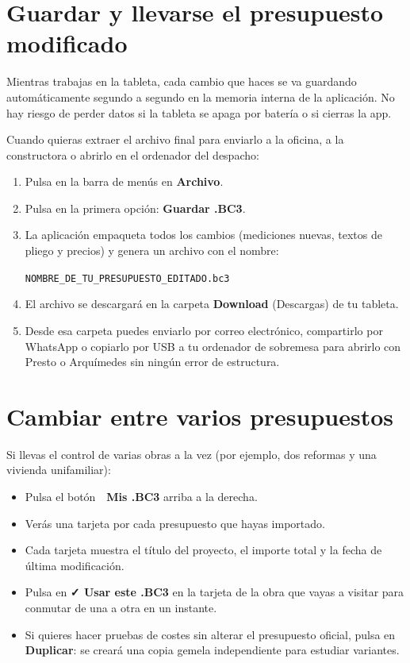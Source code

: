 \documentclass[11pt,a4paper]{article}
\begin{document}
\section{Guardar y llevarse el presupuesto modificado}

Mientras trabajas en la tableta, cada cambio que haces se va guardando automáticamente segundo a segundo en la memoria interna de la aplicación. No hay riesgo de perder datos si la tableta se apaga por batería o si cierras la app.

Cuando quieras extraer el archivo final para enviarlo a la oficina, a la constructora o abrirlo en el ordenador del despacho:

\begin{pasobox}
\begin{enumerate}[leftmargin=*]
    \item Pulsa en la barra de menús en \textbf{Archivo}.
    \item Pulsa en la primera opción: \textbf{Guardar .BC3}.
    \item La aplicación empaqueta todos los cambios (mediciones nuevas, textos de pliego y precios) y genera un archivo con el nombre:
    \begin{center}
    \texttt{NOMBRE\_DE\_TU\_PRESUPUESTO\_EDITADO.bc3}
    \end{center}
    \item El archivo se descargará en la carpeta \textbf{Download} (Descargas) de tu tableta.
    \item Desde esa carpeta puedes enviarlo por correo electrónico, compartirlo por WhatsApp o copiarlo por USB a tu ordenador de sobremesa para abrirlo con Presto o Arquímedes sin ningún error de estructura.
\end{enumerate}
\end{pasobox}

\section{Cambiar entre varios presupuestos}

Si llevas el control de varias obras a la vez (por ejemplo, dos reformas y una vivienda unifamiliar):
\begin{itemize}[leftmargin=*]
    \item Pulsa el botón \textbf{📁 Mis .BC3} arriba a la derecha.
    \item Verás una tarjeta por cada presupuesto que hayas importado.
    \item Cada tarjeta muestra el título del proyecto, el importe total y la fecha de última modificación.
    \item Pulsa en \textbf{✓ Usar este .BC3} en la tarjeta de la obra que vayas a visitar para conmutar de una a otra en un instante.
    \item Si quieres hacer pruebas de costes sin alterar el presupuesto oficial, pulsa en \textbf{Duplicar}: se creará una copia gemela independiente para estudiar variantes.
\end{itemize}
\end{document}
